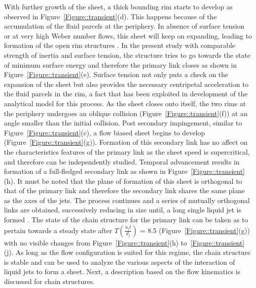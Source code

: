 \documentclass[%
aip,
sd,%
amsmath,amssymb,
preprint,%
author-year,%
]{revtex4-1}
\begin{document}
With further growth of the sheet, a thick bounding rim starts to develop as observed in Figure~\ref{Figure::transient}(d). This happens because of the accumulation of the fluid parcels at the periphery. In absence of surface tension or at very high Weber number flows, this sheet will keep on expanding, leading to formation of the open rim structures \cite{taylor1960formation,chen2013high}. In the present study with comparable strength of inertia and surface tension, the structure tries to go towards the state of minimum surface energy and therefore the primary link closes as shown in Figure~\ref{Figure::transient}(e). Surface tension not only puts a check on the expansion of the sheet but also provides the necessary centripetal acceleration to the fluid parcels in the rim, a fact that has been exploited in development of the analytical model for this process. As the sheet closes onto itself, the two rims at the periphery undergoes an oblique collision (Figure~\ref{Figure::transient}(f)) at an angle smaller than the initial collision. Post secondary impingement, similar to Figure~\ref{Figure::transient}(c), a flow biased sheet begins to develop (Figure~\ref{Figure::transient}(g)). Formation of this secondary link has no affect on the characteristics features of the primary link as the sheet speed is supercritical, and therefore can be independently studied. Temporal advancement results in formation of a full-fledged secondary link as shown in Figure~\ref{Figure::transient}(h). It must be noted that the plane of formation of this sheet is orthogonal to that of the primary link and therefore the secondary link shares the same plane as the axes of the jets. The process continues and a series of mutually orthogonal links are obtained, successively reducing in size until, a long single liquid jet is formed \citep{bush2004collision}. The state of the chain structure for the primary link can be taken as to pertain towards a steady state after $T (\frac{u_jt}{d_j}) $ = 8.5 (Figure~\ref{Figure::transient}(g)) with no visible changes from Figure~\ref{Figure::transient}(h) to~\ref{Figure::transient}(j). As long as the flow configuration is suited for this regime, the chain structure is stable and can be used to analyze the various aspects of the interaction of liquid jets to form a sheet. Next, a description based on the flow kinematics is discussed for chain structures.
\end{document}
